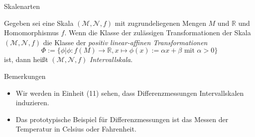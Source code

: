 \documentclass[
  8pt,
  ignorenonframetext,
]{beamer}
\providecommand{\tightlist}{%
  \setlength{\itemsep}{0pt}\setlength{\parskip}{0pt}}
\begin{document}
\begin{frame}{Skalenarten}
\protect\hypertarget{skalenarten-3}{}
\footnotesize
\begin{definition}[Intervallskala]
\justifying
Gegeben sei eine Skala $(\mathcal{M},\mathcal{N},f)$ mit zugrundeliegenen Mengen
$M$ und $\mathbb{R}$ und Homomorphismus $f$. Wenn die Klasse der zulässigen
Transformationen der Skala $(\mathcal{M},\mathcal{N},f)$ die Klasse der 
\textit{positiv linear-affinen Transformationen}
\begin{equation}
\Phi := \{\phi| \phi : f(M) \to \mathbb{R}, x \mapsto \phi(x) := \alpha x + \beta  \mbox{ mit } \alpha > 0\}
\end{equation}
ist, dann heißt $(\mathcal{M},\mathcal{N},f)$ \textit{Intervallskala}.
\end{definition}

Bemerkungen

\begin{itemize}
\tightlist
\item
  Wir werden in Einheit (11) sehen, dass Differenzmessungen
  Intervallskalen induzieren.
\item
  Das prototypische Beispiel für Differenzmessungen ist das Messen der
  Temperatur in Celsius oder Fahrenheit.
\end{itemize}
\end{frame}
\end{document}
